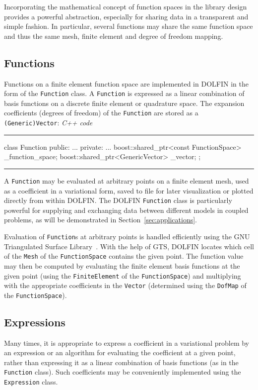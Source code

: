 \documentclass[acmtoms]{acmtrans2m}
\newenvironment{cppcode}[1]{\center\minipage{#1\textwidth}\footnotesize\hfill\it C++ code \rm\vspace{0.1cm}\hrule\renewcommand{\baselinestretch}{0.9}\footnotesize\verbatim}{\endverbatim\hrule\normalsize\endminipage\newline\endcenter}
\newcommand{\emp}[1]{\texttt{#1}}
\newcommand{\dolfin}{DOLFIN}
\begin{document}
Incorporating the mathematical concept of function spaces in the
library design provides a powerful abstraction, especially for sharing
data in a transparent and simple fashion. In particular, several
functions may share the same function space and thus the same mesh,
finite element and degree of freedom mapping.

\subsection{Functions}

Functions on a finite element function space are implemented in
\dolfin{} in the form of the \emp{Function} class.  A \emp{Function}
is expressed as a linear combination of basis functions on a discrete
finite element or quadrature space. The expansion coefficients
(degrees of freedom) of the \emp{Function} are stored as a
\emp{(Generic)Vector}:
\begin{cppcode}{0.9}
class Function
{
public:
  ...
private:
  ...
  boost::shared_ptr<const FunctionSpace> _function_space;
  boost::shared_ptr<GenericVector> _vector;
};
\end{cppcode}

A \emp{Function} may be evaluated at arbitrary points on a finite
element mesh, used as a coefficient in a variational form, saved to
file for later visualization or plotted directly from within
\dolfin{}. The \dolfin{} \emp{Function} class is particularly powerful
for supplying and exchanging data between different models in coupled
problems, as will be demonstrated in Section~\ref{sec:applications}.

Evaluation of \emp{Function}s at arbitrary points is handled
efficiently using the GNU Triangulated Surface
Library~\cite{gts:www}. With the help of GTS, \dolfin{} locates which
cell of the \emp{Mesh} of the \emp{FunctionSpace} contains the given
point. The function value may then be computed by evaluating the
finite element basis functions at the given point (using the
\emp{FiniteElement} of the \emp{FunctionSpace}) and multiplying with
the appropriate coefficients in the \emp{Vector} (determined using the
\emp{DofMap} of the \emp{FunctionSpace}).

\subsection{Expressions}

Many times, it is appropriate to express a coefficient in a
variational problem by an expression or an algorithm for evaluating
the coefficient at a given point, rather than expressing it as a
linear combination of basis functions (as in the \emp{Function}
class).  Such coefficients may be conveniently implemented using the
\emp{Expression} class.
\end{document}
